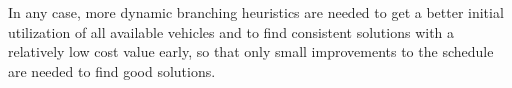 \documentclass[a4paper]{article}
\begin{document}
In any case, more dynamic branching heuristics are needed to get a better initial utilization of all available
vehicles and to find consistent solutions with a relatively low cost value early, so that only small improvements 
to the schedule are needed to find good solutions.




%
\end{document}
